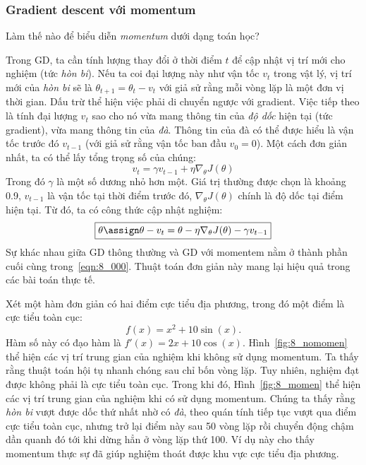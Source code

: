 \subsubsection{Gradient descent với momentum}
Làm thế nào để biểu diễn \textit{momentum} dưới dạng toán học?
 
Trong GD, ta cần tính lượng thay đổi ở thời điểm $t$ để cập nhật vị trí
mới cho nghiệm (tức \textit{hòn bi}). Nếu ta coi đại lượng này như vận tốc
$v_t$ trong vật lý, vị trí mới của \textit{hòn bi} sẽ là $\theta_{t+1} =
\theta_{t} - v_t$ với giả sử rằng mỗi vòng lặp là một đơn vị thời gian. Dấu trừ
thể hiện việc phải di chuyển ngược với gradient. Việc tiếp theo là tính đại lượng
$v_t$ sao cho nó vừa mang thông tin của \textit{độ dốc} hiện tại (tức gradient),
vừa mang thông tin của \textit{đà}. Thông tin của đà có thể được hiểu là vận tốc
trước đó $v_{t-1}$ (với giả sử rằng vận tốc ban đầu $v_0=0$). Một cách đơn giản
nhất, ta có thể lấy tổng trọng số của chúng:
\begin{equation} 
\boxed{v_{t}= \gamma v_{t-1} + \eta \nabla_{\theta}J(\theta)} 
\end{equation} 
 Trong đó $\gamma$ là một số dương nhỏ hơn một. Giá trị thường được chọn là khoảng 0.9, $v_{t-1}$ là vận tốc tại thời điểm trước đó, $ \nabla_{\theta}J(\theta)$ chính là độ dốc tại điểm hiện tại. Từ đó, ta có công thức cập nhật nghiệm:
\begin{equation} 
\label{eqn:8_000}
\boxed{\theta \assign \theta - v_t = \theta  - \eta \nabla_{\theta}J(\theta)- \gamma
v_{t-1}}
\end{equation} 
Sự khác nhau giữa GD thông thường và GD với momentem nằm ở thành phần cuối
cùng trong~\eqref{eqn:8_000}. Thuật toán đơn giản này mang lại hiệu quả trong
các bài toán thực tế. %

Xét một hàm đơn giản có hai
điểm cực tiểu địa phương, trong đó một điểm là cực tiểu toàn cục:
\begin{equation} 
f(x) = x^2 + 10\sin(x).
\end{equation} 
Hàm số này có đạo hàm là $f'(x) = 2x + 10\cos(x)$. Hình~\ref{fig:8_nomomen} thể
hiện các vị trí trung gian của nghiệm khi không sử dụng momentum. Ta thấy rằng
thuật toán hội tụ nhanh chóng sau chỉ bốn vòng lặp. Tuy nhiên, nghiệm đạt được
không phải là cực tiểu toàn cục. Trong khi đó, Hình~\ref{fig:8_momen} thể hiện các
vị trí trung gian của nghiệm khi có sử dụng momentum. Chúng ta thấy rằng
\textit{hòn bi} vượt được dốc thứ nhất nhờ có \textit{đà}, theo quán tính tiếp
tục vượt qua điểm cực tiểu toàn cục, nhưng trở lại điểm này sau 50 vòng lặp
rồi chuyển động chậm dần quanh đó tới khi dừng hẳn ở vòng lặp thứ 100. Ví dụ này
cho thấy momentum thực sự đã giúp nghiệm thoát được khu vực cực tiểu địa phương.

